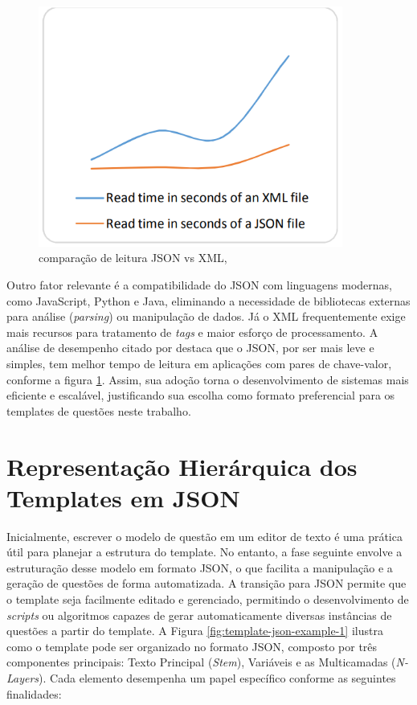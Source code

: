 \begin{figure}[ht]
	\centering
	\includegraphics[width=10cm]{./imagens/capitulo5/json-vs-xml}
	\caption{comparação de leitura JSON vs XML, \parencite{goyal2017} }
	\label{fig:json-vs-xml}
\end{figure}

Outro fator relevante é a compatibilidade do JSON com linguagens modernas, como JavaScript, Python e Java, eliminando a necessidade de bibliotecas externas para análise (\textit{parsing}) ou manipulação de dados. Já o XML frequentemente exige mais recursos para tratamento de \textit{tags} e maior esforço de processamento. A análise de desempenho citado por \parencite{goyal2017} destaca que o JSON, por ser mais leve e simples, tem melhor tempo de leitura em aplicações com pares de chave-valor, conforme a figura \ref{fig:json-vs-xml}. Assim, sua adoção torna o desenvolvimento de sistemas mais eficiente e escalável, justificando sua escolha como formato preferencial para os templates de questões neste trabalho.




\section{Representação Hierárquica dos Templates em JSON}

Inicialmente, escrever o modelo de questão em um editor de texto é uma prática útil para planejar a estrutura do template. No entanto, a fase seguinte envolve a estruturação desse modelo em formato JSON, o que facilita a manipulação e a geração de questões de forma automatizada. A transição para JSON permite que o template seja facilmente editado e gerenciado, permitindo o desenvolvimento de \textit{scripts} ou algoritmos capazes de gerar automaticamente diversas instâncias de questões a partir do template.
A Figura \ref{fig:template-json-example-1} ilustra como o template pode ser organizado no formato JSON, composto por três componentes principais: Texto Principal (\textit{Stem}), Variáveis e as Multicamadas (\textit{N-Layers}). Cada elemento desempenha um papel específico conforme as seguintes finalidades:



